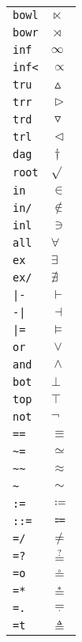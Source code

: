 \begin{longtable}{ll}
\texttt{bowl}&${}\ltimes {}$\\
\texttt{bowr}&${}\rtimes {}$\\
\texttt{inf}&${}\infty {}$\\
\texttt{inf<}&${}\propto {}$\\
\texttt{tru}&${}\vartriangle {}$\\
\texttt{trr}&${}\vartriangleright {}$\\
\texttt{trd}&${}\triangledown {}$\\
\texttt{trl}&${}\vartriangleleft {}$\\
\texttt{dag}&${}\dagger {}$\\
\texttt{root}&${}\sqrt {}$\\
\texttt{in}&${}\in {}$\\
\texttt{in/}&${}\notin {}$\\
\texttt{inl}&${}\ni {}$\\
\texttt{all}&${}\forall {}$\\
\texttt{ex}&${}\exists {}$\\
\texttt{ex/}&${}\nexists {}$\\
\texttt{|{-}}&${}\vdash {}$\\
\texttt{{-}|}&${}\dashv {}$\\
\texttt{|=}&${}\models {}$\\
\texttt{or}&${}\vee {}$\\
\texttt{and}&${}\wedge {}$\\
\texttt{bot}&${}\bot {}$\\
\texttt{top}&${}\top {}$\\
\texttt{not}&${}\neg {}$\\
\texttt{==}&${}\equiv {}$\\
\texttt{\textasciitilde =}&${}\simeq {}$\\
\texttt{\textasciitilde \textasciitilde }&${}\approx {}$\\
\texttt{\textasciitilde }&${}\sim {}$\\
\texttt{:=}&${}\coloneqq {}$\\
\texttt{::=}&${}\Coloneqq {}$\\
\texttt{=/}&${}\neq {}$\\
\texttt{=?}&${}\mathrel{\overset{?}{=}} {}$\\
\texttt{=o}&${}\mathrel{\overset{\circ}{=}} {}$\\
\texttt{=*}&${}\mathrel{\overset{*}{=}} {}$\\
\texttt{=.}&${}\mathrel{\underset{\cdotp}{=}} {}$\\
\texttt{=t}&${}\triangleq {}$\\

\end{longtable}
